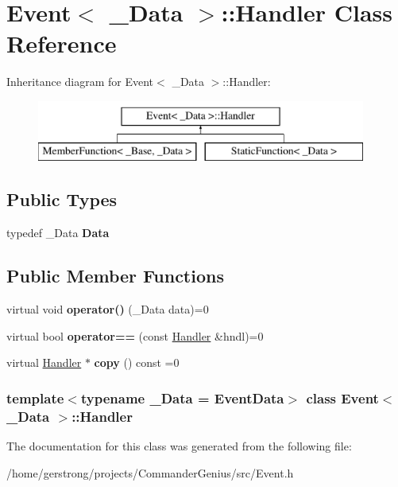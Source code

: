 \hypertarget{class_event_1_1_handler}{
\section{Event$<$ \_\-Data $>$::Handler Class Reference}
\label{class_event_1_1_handler}
}
Inheritance diagram for Event$<$ \_\-Data $>$::Handler:\begin{figure}[H]
\begin{center}
\leavevmode
\includegraphics[height=2cm]{class_event_1_1_handler}
\end{center}
\end{figure}
\subsection*{Public Types}
\begin{DoxyCompactItemize}
\item 
\hypertarget{class_event_1_1_handler_aa9ecb901f80f897f9e5963a690b2422c}{
typedef \_\-Data {\bfseries Data}}
\label{class_event_1_1_handler_aa9ecb901f80f897f9e5963a690b2422c}

\end{DoxyCompactItemize}
\subsection*{Public Member Functions}
\begin{DoxyCompactItemize}
\item 
\hypertarget{class_event_1_1_handler_a8605615d7071b24bf92c372db69172d4}{
virtual void {\bfseries operator()} (\_\-Data data)=0}
\label{class_event_1_1_handler_a8605615d7071b24bf92c372db69172d4}

\item 
\hypertarget{class_event_1_1_handler_a45a3ef82c5a7c2add9593143d630451b}{
virtual bool {\bfseries operator==} (const \hyperlink{class_event_1_1_handler}{Handler} \&hndl)=0}
\label{class_event_1_1_handler_a45a3ef82c5a7c2add9593143d630451b}

\item 
\hypertarget{class_event_1_1_handler_adb57ffd4869631fbbdfc03912f112ec5}{
virtual \hyperlink{class_event_1_1_handler}{Handler} $\ast$ {\bfseries copy} () const =0}
\label{class_event_1_1_handler_adb57ffd4869631fbbdfc03912f112ec5}

\end{DoxyCompactItemize}
\subsubsection*{template$<$typename \_\-Data = EventData$>$ class Event$<$ \_\-Data $>$::Handler}



The documentation for this class was generated from the following file:\begin{DoxyCompactItemize}
\item 
/home/gerstrong/projects/CommanderGenius/src/Event.h\end{DoxyCompactItemize}
